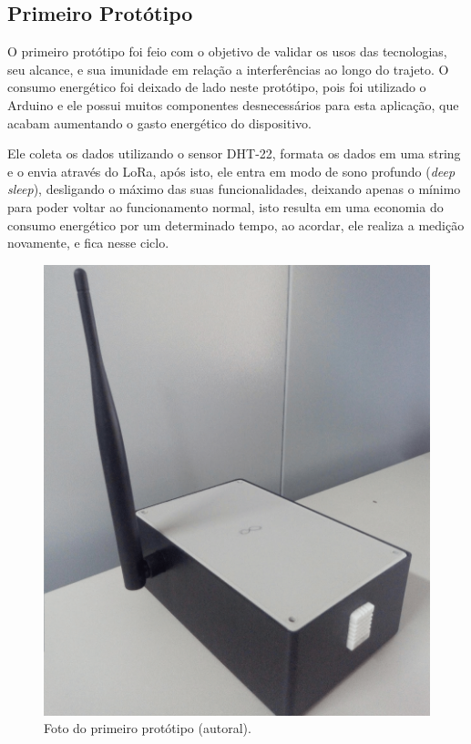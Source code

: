 \subsection{Primeiro Protótipo}
\label{metod:end-node:1-proto}
O primeiro protótipo foi feio com o objetivo de validar os usos das tecnologias, seu alcance, e sua imunidade em relação a interferências ao longo do trajeto. O consumo energético foi deixado de lado neste protótipo, pois foi utilizado o Arduino e ele possui muitos componentes desnecessários para esta aplicação, que acabam aumentando o gasto energético do dispositivo.

Ele coleta os dados utilizando o sensor DHT-22, formata os dados em uma string e o envia através do LoRa, após isto, ele entra em modo de sono profundo (\textit{deep sleep}), desligando o máximo das suas funcionalidades, deixando apenas o mínimo para poder voltar ao funcionamento normal, isto resulta em uma economia do consumo energético por um determinado tempo, ao acordar, ele realiza a medição novamente, e fica nesse ciclo.

\begin{figure}[H]
  \centering
  \includegraphics[width=.80\textwidth]{assets/end-node-proto-1.png} 
  \caption{Foto do primeiro protótipo (autoral).}
  \label{fig:end-node-proto-1} 
\end{figure}

